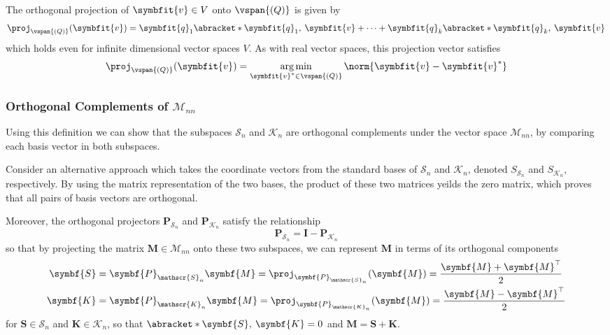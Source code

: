 \documentclass{article}
\DeclareMathOperator*{\argmin}{arg\,min}
\begin{document}
The orthogonal projection of \(\symbfit{v} \in V\) onto \(\vspan{\left( Q \right)}\) is given by
\begin{equation*}
    \proj_{\vspan{\left( Q \right)}}{\left( \symbfit{v} \right)} = \symbfit{q}_1 \abracket*{\symbfit{q}_1,\: \symbfit{v}} + \cdots + \symbfit{q}_k \abracket*{\symbfit{q}_k,\: \symbfit{v}}
\end{equation*}
which holds even for infinite dimensional vector spaces \(V\). As with real vector spaces, this projection vector satisfies
\begin{equation*}
    \proj_{\vspan{\left( Q \right)}}{\left( \symbfit{v} \right)} = \argmin_{\symbfit{v}^\ast \in \vspan{\left( Q \right)}} \norm{\symbfit{v} - \symbfit{v}^\ast}
\end{equation*}
\subsubsection{Orthogonal Complements of \texorpdfstring{\(\mathscr{M}_{nn}\)}{Mnn}}
Using this definition we can show that the subspaces \(\mathscr{S}_n\) and \(\mathscr{K}_n\) are orthogonal complements under the vector space
\(\mathscr{M}_{nn}\), by comparing each basis vector in both subspaces.

Consider an alternative approach which takes the coordinate vectors from the standard bases of \(\mathscr{S}_n\) and \(\mathscr{K}_n\),
denoted \(S_{\mathscr{S}_n}\) and \(S_{\mathscr{K}_n}\), respectively.
By using the matrix representation of the two bases, the product of these two matrices yeilds the zero matrix, which proves
that all pairs of basis vectors are orthogonal.

Moreover, the orthogonal projectors \(\symbf{P}_{\mathscr{S}_n}\) and \(\symbf{P}_{\mathscr{K}_n}\) satisfy the relationship
\begin{equation*}
    \symbf{P}_{\mathscr{S}_n} = \symbf{I} - \symbf{P}_{\mathscr{K}_n}
\end{equation*}
so that by projecting the matrix \(\symbf{M} \in \mathscr{M}_{nn}\) onto these two subspaces, we can represent \(\symbf{M}\) in terms of
its orthogonal components
\begin{align*}
    \symbf{S} & = \symbf{P}_{\mathscr{S}_n} \symbf{M} = \proj_{\symbf{P}_{\mathscr{S}_n}}{\left( \symbf{M} \right)} = \frac{\symbf{M} + \symbf{M}^\top}{2} \\
    \symbf{K} & = \symbf{P}_{\mathscr{K}_n} \symbf{M} = \proj_{\symbf{P}_{\mathscr{K}_n}}{\left( \symbf{M} \right)} = \frac{\symbf{M} - \symbf{M}^\top}{2}
\end{align*}
for \(\symbf{S} \in \mathscr{S}_n\) and \(\symbf{K} \in \mathscr{K}_n\), so that \(\abracket*{\symbf{S},\: \symbf{K}} = 0\) and \(\symbf{M} = \symbf{S} + \symbf{K}\).
\end{document}
